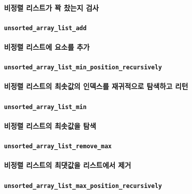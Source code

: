 \documentclass[UTF8, a4paper]{report}
\begin{document}
            \paragraph{%
                \normalfont 비정렬 리스트가 꽉 찼는지 검사
            }

            \paragraph{\texttt{unsorted\_array\_list\_add}}
            \paragraph{%
                \normalfont 비정렬 리스트에 요소를 추가
            }

            \paragraph{\texttt{unsorted\_array\_list\_min\_position\_recursively}}
            \paragraph{%
                \normalfont 비정렬 리스트의 최솟값의 인덱스를 재귀적으로 탐색하고 리턴
            }

            \paragraph{\texttt{unsorted\_array\_list\_min}}
            \paragraph{%
                \normalfont 비정렬 리스트의 최솟값을 탐색
            }

            \paragraph{\texttt{unsorted\_array\_list\_remove\_max}}
            \paragraph{%
                \normalfont 비정렬 리스트의 최댓값을 리스트에서 제거
            }

            \paragraph{\texttt{unsorted\_array\_list\_max\_position\_recursively}}
\end{document}
